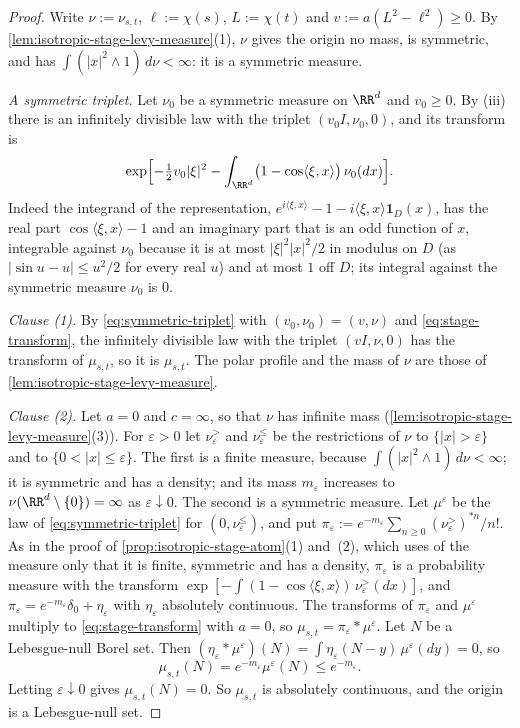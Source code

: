 \begin{proof}
\leanok
Write $\nu := \nu_{s,t}$, $\ell := \chi(s)$, $L := \chi(t)$ and $v := a(L^2 - \ell^2) \ge 0$. By
\ref{lem:isotropic-stage-levy-measure}(1), $\nu$ gives the origin no mass, is symmetric, and has
$\int(|x|^2 \wedge 1)\,d\nu < \infty$: it is a symmetric \Levy{} measure.

\emph{A symmetric triplet.} Let $\nu_0$ be a symmetric \Levy{} measure on $\RR^d$ and
$v_0 \ge 0$. By (iii) there is an infinitely divisible law with the triplet
$(v_0I, \nu_0, 0)$, and its transform is
\begin{equation}\label{eq:symmetric-triplet}
  \exp\Bigl[-\tfrac12 v_0|\xi|^2 - \int_{\RR^d}\bigl(1 - \cos\langle\xi,x\rangle\bigr)\,\nu_0(dx)\Bigr] .
\end{equation}
Indeed the integrand of the representation, $e^{i\langle\xi,x\rangle} - 1
- i\langle\xi,x\rangle\mathbf 1_D(x)$, has the real part $\cos\langle\xi,x\rangle - 1$ and an
imaginary part that is an odd function of $x$, integrable against $\nu_0$ because it is at most
$|\xi|^2|x|^2/2$ in modulus on $D$ (as $|\sin u - u| \le u^2/2$ for every real $u$) and at most
$1$ off $D$; its integral against the symmetric
measure $\nu_0$ is $0$.

\emph{Clause (1).} By \ref{eq:symmetric-triplet} with $(v_0,\nu_0) = (v,\nu)$ and
\ref{eq:stage-transform}, the infinitely divisible law with the triplet $(vI, \nu, 0)$ has the
transform of $\mu_{s,t}$, so it is $\mu_{s,t}$. The polar profile and the mass of $\nu$ are
those of \ref{lem:isotropic-stage-levy-measure}.

\emph{Clause (2).} Let $a = 0$ and $c = \infty$, so that $\nu$ has infinite mass
(\ref{lem:isotropic-stage-levy-measure}(3)). For $\varepsilon > 0$ let $\nu^{>}_\varepsilon$ and
$\nu^{\le}_\varepsilon$ be the restrictions of $\nu$ to $\{|x| > \varepsilon\}$ and to
$\{0 < |x| \le \varepsilon\}$. The first is a finite measure, because
$\int(|x|^2 \wedge 1)\,d\nu < \infty$; it is symmetric and has a density; and its mass
$m_\varepsilon$ increases to $\nu(\RR^d \setminus \{0\}) = \infty$ as $\varepsilon \downarrow 0$.
The second is a symmetric \Levy{} measure. Let $\mu^\varepsilon$ be the law of
\ref{eq:symmetric-triplet} for $(0, \nu^{\le}_\varepsilon)$, and put
$\pi_\varepsilon := e^{-m_\varepsilon}\sum_{n \ge 0}(\nu^{>}_\varepsilon)^{*n}/n!$. As in the
proof of \ref{prop:isotropic-stage-atom}(1) and~(2), which uses of the measure only that it is
finite, symmetric and has a density, $\pi_\varepsilon$ is a probability measure with the
transform $\exp[-\int(1 - \cos\langle\xi,x\rangle)\,\nu^{>}_\varepsilon(dx)]$, and
$\pi_\varepsilon = e^{-m_\varepsilon}\delta_0 + \eta_\varepsilon$ with $\eta_\varepsilon$
absolutely continuous. The transforms of $\pi_\varepsilon$ and $\mu^\varepsilon$ multiply to
\ref{eq:stage-transform} with $a = 0$, so $\mu_{s,t} = \pi_\varepsilon * \mu^\varepsilon$. Let
$N$ be a Lebesgue-null Borel set. Then
$(\eta_\varepsilon * \mu^\varepsilon)(N) = \int\eta_\varepsilon(N - y)\,\mu^\varepsilon(dy) = 0$,
so
\[
  \mu_{s,t}(N) = e^{-m_\varepsilon}\mu^\varepsilon(N) \le e^{-m_\varepsilon} .
\]
Letting $\varepsilon \downarrow 0$ gives $\mu_{s,t}(N) = 0$. So $\mu_{s,t}$ is absolutely
continuous, and the origin is a Lebesgue-null set.


\end{proof}
